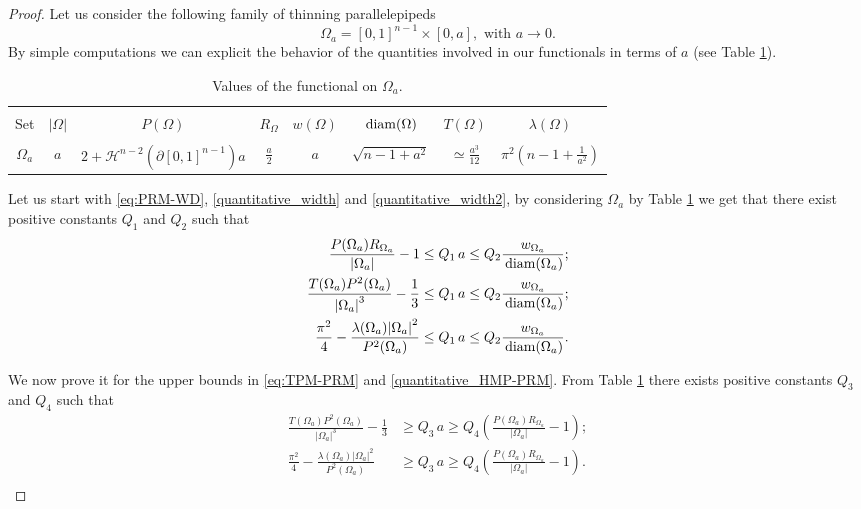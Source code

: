 \documentclass[oneside,a4paper,11pt,notitlepage]{article}
\newcommand{\abs}[1]{{\left|#1\right|}}
\theoremstyle{definition}
\theoremstyle{plain}
\theoremstyle{definition}
\DeclareMathOperator{\diam}{\, \textup{diam}}
\begin{document}
\begin{proof}
Let us  consider the following family of thinning parallelepipeds 
$$
\Omega_a = [0,1]^{n-1} \times [0,a], \text{ with } a \to 0.
$$
By simple computations we can explicit the behavior of the quantities involved in our functionals  in terms of $a$ (see Table \ref{tab:tab1}).
\begin{table}[!ht]
\centering
\begin{tabular}{|c||c|c|c|c|c|c|c|}
    \hline

    & & & & & & &\\[-0.5ex]
   Set
    & $|\Omega|$ &  $P(\Omega)$  &  $R_\Omega$ & $w(\Omega)$ & $\diam(\Omega)$ & $T(\Omega)$ & $\lambda(\Omega)$ 
    \tabularnewline[3ex]
    \hline\hline

    & & & & & & &\\[-0.5ex]
    $\Omega_a$  & $a$ & $2 + \mathcal{H}^{n-2}\left(\partial [0,1]^{n-1}\right) a$ & $\frac{a}{2}$ & $a$ & $\sqrt{n-1+a^2}$ & $\simeq \frac{a^3}{12}$& $\pi^2 \left(n-1+\frac{1}{a^2}\right)$ 
    \tabularnewline[3ex]
    \hline

\end{tabular}
\caption{Values of the functional on $ \Omega_a$.}\label{tab:tab1}
\end{table}
Let us start with \eqref{eq:PRM-WD}, \eqref{quantitative_width} and  \eqref{quantitative_width2}, by considering $\Omega_a$ by Table \ref{tab:tab1} we get that there exist positive constants $Q_1$ and $Q_2$ such that
\begin{align*}
\frac{P(\Omega_a)R_{\Omega_a}}{\abs{\Omega_a}}  -1 &\leq Q_1 \,a  \leq Q_2 \frac{w_{\Omega_a}}{\diam(\Omega_a)}; \\
\frac{T(\Omega_a)P^2(\Omega_a)}{\abs{\Omega_a}^3}- \frac{1}{3} &\leq Q_1\, a \leq Q_2 \frac{w_{\Omega_a}}{\diam(\Omega_a)};\\
\frac{\pi^2}{4}- \frac{\lambda(\Omega_a)\abs{\Omega_a}^2}{ P^2(\Omega_a)}&\leq Q_1\, a \leq Q_2  \frac{w_{\Omega_a}}{\diam(\Omega_a)}.
\end{align*}

 We now prove it for the upper bounds in \eqref{eq:TPM-PRM} and  \eqref{quantitative_HMP-PRM}. %
 From Table \ref{tab:tab1} there exists positive constants $Q_3$ and $Q_4$ such that
\begin{align*}
\frac{T(\Omega_a)P^2(\Omega_a)}{\abs{\Omega_a}^3}- \frac{1}{3} &\geq Q_3\, a \geq Q_4 \left(\frac{P(\Omega_a)R_{\Omega_a}}{\abs{\Omega_a}}  -1\right);\\
\frac{\pi^2}{4}- \frac{\lambda(\Omega_a)\abs{\Omega_a}^2}{ P^2(\Omega_a)}
&\geq Q_3\, a \geq Q_4 \left(\frac{P(\Omega_a)R_{\Omega_a}}{\abs{\Omega_a}}  -1\right). \\
\end{align*}
\end{proof}
\end{document}
